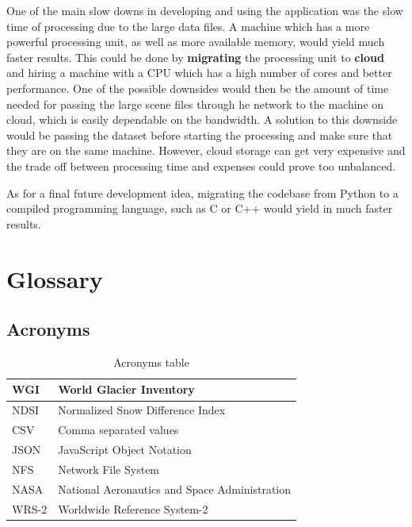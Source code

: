 \documentclass[12pt, a4paper]{report}
\begin{document}
	\par One of the main slow downs in developing and using the application was the slow time of processing due to the large data files. A machine which has a more powerful processing unit, as well as more available memory, would yield much faster results. This could be done by \textbf{migrating} the processing unit to \textbf{cloud} and hiring a machine with a CPU which has a high number of cores and better performance. One of the possible downsides would then be the amount of time needed for passing the large scene files through he network to the machine on cloud, which is easily dependable on the bandwidth. A solution to this downside would be passing the dataset before starting the processing and make sure that they are on the same machine. However, cloud storage can get very expensive and the trade off between processing time and expenses could prove too unbalanced.
	
	\par As for a final future development idea, migrating the codebase from Python to a compiled programming language, such as C or C++ would yield in much faster results.

	
	\newpage{}
	\chapter{Glossary}
	
	
	\section{Acronyms}
	
		\begin{table} [H]
		\centering
		\begin{tabular} {|  l | L{10cm} |}
			\hline
			WGI & World Glacier Inventory \\ [0.2ex]
			\hline
			NDSI & Normalized Snow Difference Index \\ [0.2ex]
			\hline
			CSV & Comma separated values \\ [0.2ex]
			\hline
			JSON & JavaScript Object Notation \\ [0.2ex]
			\hline
			NFS & Network File System \\ [0.2ex]
			\hline
			NASA & National Aeronautics and Space Administration \\ [0.2ex]
			\hline
			WRS-2 & Worldwide Reference System-2 \\ [0.2ex]
			\hline
		\end{tabular}
		\caption{Acronyms table }
		\label{table:acron}
	\end{table}

	
	

	
\end{document}
